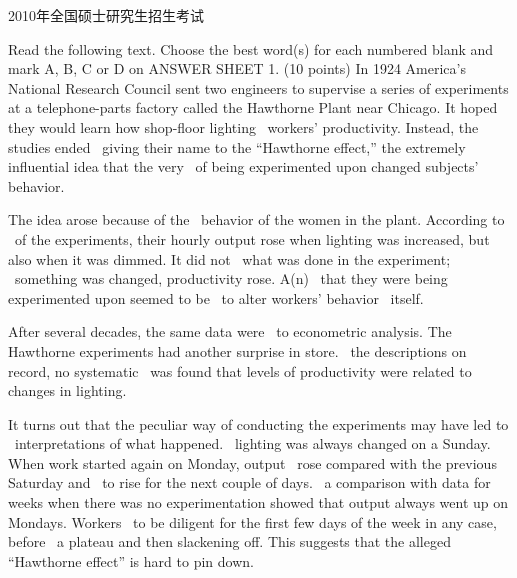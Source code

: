 \documentclass[12pt,a4paper]{article}
\begin{document}
\begin{coverpage}{2010年全国硕士研究生招生考试}
\end{coverpage}

\begin{cloze}{
  Read the following text. Choose the best word(s) for each numbered blank and mark A, B, C or D on ANSWER SHEET 1. (10 points)
}
In 1924 America's National Research Council sent two engineers to supervise a series of experiments at a telephone-parts factory called the Hawthorne Plant near Chicago. It hoped they would learn how shop-floor lighting \blank\ workers' productivity. Instead, the studies ended \blank\ giving their name to the ``Hawthorne effect,'' the extremely influential idea that the very \blank\ of being experimented upon changed subjects' behavior.

The idea arose because of the \blank\ behavior of the women in the plant. According to \blank\ of the experiments, their hourly output rose when lighting was increased, but also when it was dimmed. It did not \blank\ what was done in the experiment; \blank\ something was changed, productivity rose. A(n) \blank\ that they were being experimented upon seemed to be \blank\ to alter workers' behavior \blank\ itself.

After several decades, the same data were \blank\ to econometric analysis. The Hawthorne experiments had another surprise in store. \blank\ the descriptions on record, no systematic \blank\ was found that levels of productivity were related to changes in lighting.

It turns out that the peculiar way of conducting the experiments may have led to \blank\ interpretations of what happened. \blank\, lighting was always changed on a Sunday. When work started again on Monday, output \blank\ rose compared with the previous Saturday and \blank\ to rise for the next couple of days. \blank\, a comparison with data for weeks when there was no experimentation showed that output always went up on Mondays. Workers \blank\ to be diligent for the first few days of the week in any case, before \blank\ a plateau and then slackening off. This suggests that the alleged ``Hawthorne effect'' is hard to pin down.
\end{cloze}
\end{document}
